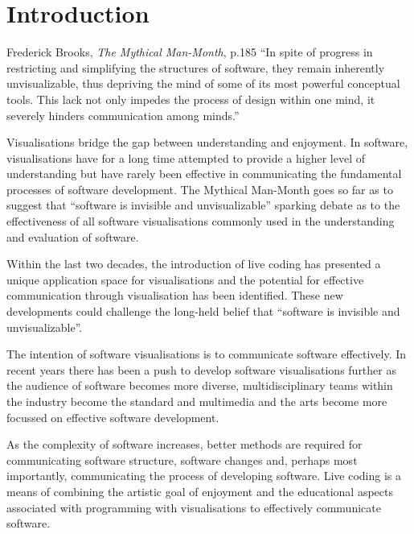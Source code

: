 
\chapter{Introduction}
\label{chap:introduction}

\begin{chapquote}{Frederick Brooks, \textit{The Mythical Man-Month}, p.185}
``In spite of progress in restricting and simplifying the structures of software, they remain inherently unvisualizable, thus depriving the mind of some of its most powerful conceptual tools. This lack not only impedes the process of design within one mind, it severely hinders communication among minds.''
\end{chapquote}

Visualisations bridge the gap between understanding and enjoyment. In software, visualisations have for a long time attempted to provide a higher level of understanding but have rarely been effective in communicating the fundamental processes of software development. The Mythical Man-Month goes so far as to suggest that ``software is invisible and unvisualizable''\cite{Brooks1995} sparking debate as to the effectiveness of all software visualisations commonly used in the understanding and evaluation of software. 

Within the last two decades, the introduction of live coding has presented a unique application space for visualisations and the potential for effective communication through visualisation has been identified. These new developments could challenge the long-held belief that ``software is invisible and unvisualizable''.

The intention of software visualisations is to communicate software effectively. In recent years there has been a push to develop software visualisations further as the audience of software becomes more diverse, multidisciplinary teams within the industry become the standard and multimedia and the arts become more focussed on effective software development.

As the complexity of software increases, better methods are required for communicating software structure, software changes and, perhaps most importantly, communicating the process of developing software. Live coding is a means of combining the artistic goal of enjoyment and the educational aspects associated with programming with visualisations to effectively communicate software.

